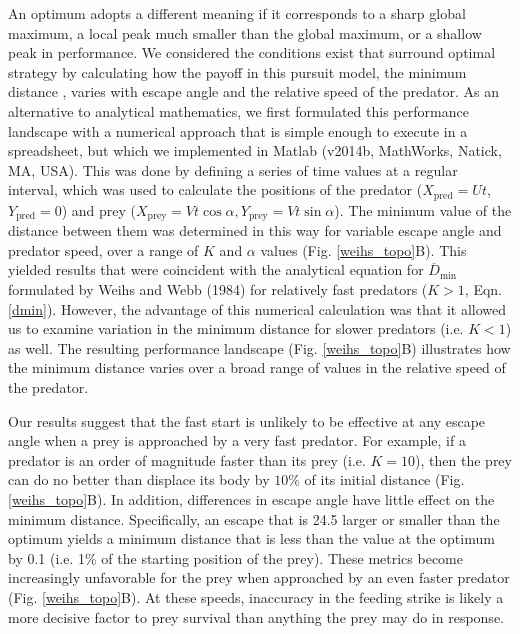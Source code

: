 \documentclass[12pt]{article}
\newcommand{\ol}{\overline}
\begin{document}
An optimum adopts a different meaning if it corresponds to a sharp global maximum, a local peak much smaller than the global maximum, or a shallow peak in performance. We considered the conditions exist that surround optimal strategy by calculating how the payoff in this pursuit model, the minimum distance \citep{Weihs:1984tb}, varies with escape angle and the relative speed of the predator. 
As an alternative to analytical mathematics, we first formulated this performance landscape with a numerical approach that is simple enough to execute in a spreadsheet, but which we implemented in Matlab (v2014b, MathWorks, Natick, MA, USA). 
This was done by defining a series of time values at a regular interval, which was used to calculate the positions of the predator ($X_{\text{pred}} = Ut$, $Y_{\text{pred}} = 0$) and prey ($X_{\text{prey}}=Vt\cos\alpha,Y_{\text{prey}}=Vt\sin\alpha$). 
The minimum value of the distance between them was determined in this way for variable escape angle and predator speed, over a range of $K$ and $\alpha$ values (Fig. \ref{weihs_topo}B). This yielded results that were coincident with the analytical equation for $\ol D_{\text{min}}$ formulated by Weihs and Webb (1984) for relatively fast predators ($K>1$, Eqn. \ref{dmin}). 
However, the advantage of this numerical calculation was that it allowed us to examine variation in the minimum distance for slower predators (i.e. $K<1$) as well. The resulting performance landscape (Fig. \ref{weihs_topo}B) illustrates how the minimum distance varies over a broad range of values in the relative speed of the predator.

Our results suggest that the fast start is unlikely to be effective at any escape angle when a prey is approached by a very fast predator. For example, if a predator is an order of magnitude faster than its prey (i.e. $K=10$), then the prey can do no better than displace its body by $10\%$ of its initial distance (Fig. \ref{weihs_topo}B). 
In addition, differences in escape angle have little effect on the minimum distance. Specifically, an escape that is  24.5\textdegree\hspace{2pt} larger or smaller than the optimum yields a minimum distance that is less than the value at the optimum by 0.1 (i.e. 1\% of the starting position of the prey). 
These metrics become increasingly unfavorable for the prey when approached by an even faster predator (Fig. \ref{weihs_topo}B). At these speeds, inaccuracy in the feeding strike is likely a more decisive factor to prey survival than anything the prey may do in response.
\end{document}
